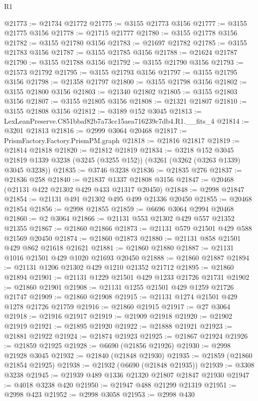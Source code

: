 \begin{lexlean}{R1}
\begin{coremodule}
@21773 := @21734 @21772
@21775 := @3155 @21773 @3156
@21777 := @3155 @21775 @3156
@21778 := @21715 @21777
@21780 := @3155 @21778 @3156
@21782 := @3155 @21780 @3156
@21783 := @21697 @21782
@21785 := @3155 @21783 @3156
@21787 := @3155 @21785 @3156
@21788 := @21624 @21787
@21790 := @3155 @21788 @3156
@21792 := @3155 @21790 @3156
@21793 := @21573 @21792
@21795 := @3155 @21793 @3156
@21797 := @3155 @21795 @3156
@21798 := @21358 @21797
@21800 := @3155 @21798 @3156
@21802 := @3155 @21800 @3156
@21803 := @21340 @21802
@21805 := @3155 @21803 @3156
@21807 := @3155 @21805 @3156
@21808 := @21321 @21807
@21810 := @3155 @21808 @3156
@21812 := @3189 @152 @3045
@21813 := LexLeanPreserve.C851bbaf82b7a73cc15aea716239c7db4.R1.__fits_4
@21814 := @3201 @21813
@21816 := @2999 @3064 @20468
@21817 := PrismFactory.Factory.PrismPM.graph
@21818 := @21816 @21817
@21819 := @21814 @21818
@21820 := @21812 @21819
@21834 := @3218
    @152
    @3045
    @21819
    @1339
    @3238
    (@3245 (@3255 @152))
    (@3261 (@3262 (@3263 @1339) @3045 @3238))
@21835 := @3746 @3238
@21836 := @21835 @276
@21837 := @21836 @258
@21840 := @21837 @1337 @21808 @3156
@21847 := @20468 (@21131 @422 @21302 @429 @433 @21317 @20450)
@21848 := @2998 @21847
@21854 := @21131 @491 @21302 @495 @499 @21336 @20450
@21855 := @20468 @21854
@21856 := @2998 @21855
@21859 := @6696 @3064 @2994 @20468
@21860 := @2 @3064
@21866 := @21131 @553 @21302 @429 @557 @21352 @21355
@21867 := @21860 @21866
@21873 := @21131 @579 @21501 @429 @588 @21569 @20450
@21874 := @21860 @21873
@21880 := @21131 @858 @21501 @429 @862 @21618 @21621
@21881 := @21860 @21880
@21887 := @21131 @1016 @21501 @429 @1020 @21693 @20450
@21888 := @21860 @21887
@21894 := @21131 @1206 @21302 @429 @1210 @21352 @21712
@21895 := @21860 @21894
@21901 := @21131 @1229 @21501 @429 @1233 @21726 @21731
@21902 := @21860 @21901
@21908 := @21131 @1255 @21501 @429 @1259 @21726 @21747
@21909 := @21860 @21908
@21915 := @21131 @1274 @21501 @429 @1278 @21726 @21759
@21916 := @21860 @21915
@21917 := @27 @3064
@21918 := @21916 @21917
@21919 := @21909 @21918
@21920 := @21902 @21919
@21921 := @21895 @21920
@21922 := @21888 @21921
@21923 := @21881 @21922
@21924 := @21874 @21923
@21925 := @21867 @21924
@21926 := @21859 @21925
@21928 := @6690 (@21856 @21926)
@21930 := @2998 @21928 @3045
@21932 := @21840 (@21848 @21930)
@21935 := @21859 (@21860 @21854 @21925)
@21938 := @21932 (@6690 (@21848 @21935))
@21939 := @3308 @3238
@21945 := @21939 @489 @1336 @21320 @21807 @21847 @21930
@21947 := @4018 @3238 @420
@21950 := @21947 @488 @21299 @21319
@21951 := @2998 @423
@21952 := @2998 @3058
@21953 := @2998 @430

\end{coremodule}
\end{lexlean}
